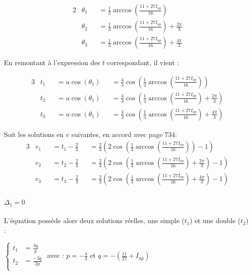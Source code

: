 \documentclass[12pt,a4paper,onecolumn]{article}
\begin{document}
\begin{alignat*}{2}
&\theta_1 &&= \frac{1}{3}\arccos(\frac{11 + 27I_{ap}}{16})\\
&\theta_2 &&= \frac{1}{3}\arccos(\frac{11 + 27I_{ap}}{16}) + \frac{2\pi}{3}\\
&\theta_3 &&= \frac{1}{3}\arccos(\frac{11 + 27I_{ap}}{16}) + \frac{4\pi}{3}
\end{alignat*}

En remontant à l'expression des $t$ correspondant, il vient :

\begin{alignat*}{3}
&t_1 &&= u\cos(\theta_1) &&= \frac{4}{3}\cos(\frac{1}{3}\arccos(\frac{11 + 27I_{ap}}{16}))\\
&t_2 &&= u\cos(\theta_1) &&= \frac{4}{3}\cos(\frac{1}{3}\arccos(\frac{11 + 27I_{ap}}{16}) + \frac{2\pi}{3})\\
&t_3 &&= u\cos(\theta_1) &&= \frac{4}{3}\cos(\frac{1}{3}\arccos(\frac{11 + 27I_{ap}}{16}) + \frac{4\pi}{3})
\end{alignat*}

Soit les solutions en $v$ suivantes, en accord avec \cite{zwillinger2011crc} page 734:
\begin{alignat}{3}
&v_1 &&= t_1 - \frac{2}{3} &&= \displaystyle{\frac{2}{3}\left(2\cos\left(\frac{1}{3}\arccos\left(\frac{11 + 27I_{ap}}{16}\right)\right) - 1\right)} \label{Branche1}\\
&v_2 &&= t_2 - \frac{2}{3} &&= \displaystyle{\frac{2}{3}\left(2\cos\left(\frac{1}{3}\arccos\left(\frac{11 + 27I_{ap}}{16}\right) + \frac{2\pi}{3}\right) - 1\right)} \label{Branche2}\\
&v_3 &&= t_3 - \frac{2}{3} &&= \displaystyle{\frac{2}{3}\left(2\cos\left(\frac{1}{3}\arccos\left(\frac{11 + 27I_{ap}}{16}\right) + \frac{4\pi}{3}\right) - 1\right)} \label{Branche3}
\end{alignat}

\paragraph{$\Delta_1 = 0$} L'équation possède alors deux solutions réelles, une simple ($t_1$) et une double ($t_2$) :

$\left\{
\begin{array}{rl}
t_1 &= \displaystyle{\frac{3q}{p}}\\
t_2 &= \displaystyle{\frac{-3q}{2p}}\\
\end{array}
\right.$
avec :
$p = -\displaystyle{\frac{4}{3}}$ et $q = -\displaystyle{\left(\frac{11}{27} + I_{ap}\right)}$
\end{document}

